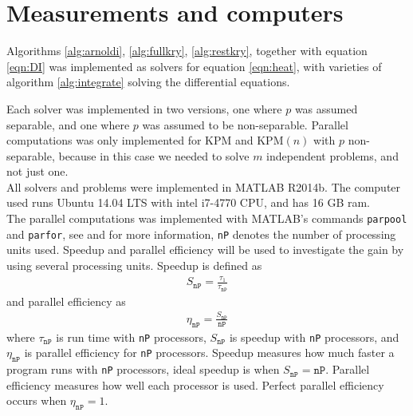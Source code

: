 \section{Measurements and computers} \label{sec:not}
Algorithms \ref{alg:arnoldi}, \ref{alg:fullkry}, \ref{alg:restkry}, together with equation \ref{eqn:DI} was implemented as solvers for equation \ref{eqn:heat}, with varieties of algorithm \ref{alg:integrate} solving the differential equations. 

Each solver was implemented in two versions, one where $p$ was assumed separable, and one where $p$ was assumed to be non-separable. Parallel computations was only implemented for KPM and KPM$(n)$ with $p$ non-separable, because in this case we needed to solve $m$ independent problems, and not just one.\\ %

All solvers and problems were implemented in MATLAB R2014b. The computer used runs Ubuntu 14.04 LTS with intel  i7-4770 CPU, and has 16 GB ram. \\

The parallel computations was implemented with MATLAB's commands \texttt{parpool} and \texttt{parfor}, see \cite{parpool} and \cite{parfor} for more information, \texttt{nP} denotes the number of processing units used. Speedup and parallel efficiency will be used to investigate the gain by using several processing units. Speedup is defined as
\begin{align*}
S_\texttt{nP} = \frac{\tau_1}{\tau_\texttt{nP}}
\end{align*}
and parallel efficiency as
\begin{align*}
\eta_\texttt{nP} = \frac{S_\texttt{nP}}{\texttt{nP}}
\end{align*}
where $\tau_\texttt{nP}$ is run time with \texttt{nP} processors, $S_\texttt{nP}$ is speedup with \texttt{nP} processors, and $\eta_\texttt{nP}$ is parallel efficiency for \texttt{nP} processors. Speedup measures how much faster a program runs with \texttt{nP} processors, ideal speedup is when $S_\texttt{nP} = \texttt{nP}$. Parallel efficiency measures how well each processor is used. Perfect parallel efficiency occurs when $\eta_\texttt{nP} = 1$.\\

